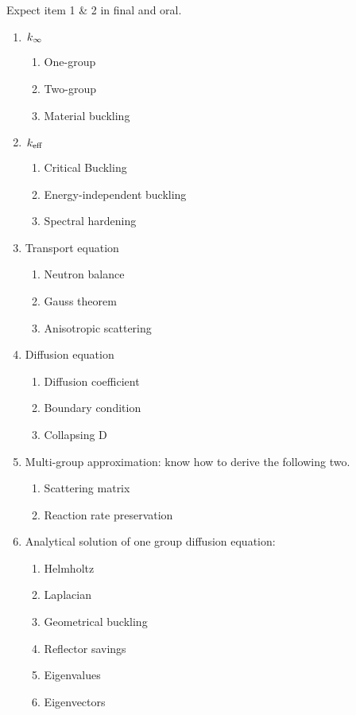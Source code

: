 \documentclass{school-22.211-notes}
\date{May 23, 2012}
\begin{document}
\maketitle

\clearpage
{}
Expect item 1 \& 2 in final and oral. 
\begin{enumerate}
\item $\left. k_{\infty} \right.$
  \begin{enumerate}
  \item One-group
  \item Two-group
  \item Material buckling
  \end{enumerate}

\item $\left. k_{\mathrm{eff}} \right.$
  \begin{enumerate}
  \item Critical Buckling
  \item Energy-independent buckling
  \item Spectral hardening
  \end{enumerate}

\item Transport equation
  \begin{enumerate}
    \item Neutron balance
    \item Gauss theorem
    \item Anisotropic scattering
  \end{enumerate}

\item Diffusion equation
  \begin{enumerate}
  \item Diffusion coefficient
  \item Boundary condition
  \item Collapsing D 
  \end{enumerate}

\item Multi-group approximation: know how to derive the following two. 
  \begin{enumerate}
    \item Scattering matrix
    \item Reaction rate preservation
  \end{enumerate}

\item Analytical solution of one group diffusion equation: 
  \begin{enumerate}
  \item Helmholtz
  \item Laplacian
  \item Geometrical buckling
  \item Reflector savings
  \item Eigenvalues
  \item Eigenvectors
  \end{enumerate}


\end{enumerate}
\end{document}
